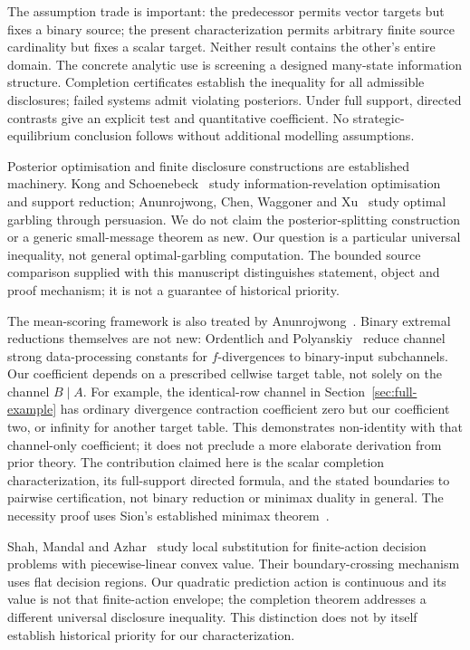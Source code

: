 \documentclass[11pt,a4paper]{article}
\begin{document}
The assumption trade is important: the predecessor permits vector targets but fixes a binary source; the present characterization permits arbitrary finite source cardinality but fixes a scalar target. Neither result contains the other's entire domain. The concrete analytic use is screening a designed many-state information structure. Completion certificates establish the inequality for all admissible disclosures; failed systems admit violating posteriors. Under full support, directed contrasts give an explicit test and quantitative coefficient. No strategic-equilibrium conclusion follows without additional modelling assumptions.

Posterior optimisation and finite disclosure constructions are established machinery. Kong and Schoenebeck~\cite{KS} study information-revelation optimisation and support reduction; Anunrojwong, Chen, Waggoner and Xu~\cite{ACWX} study optimal garbling through persuasion. We do not claim the posterior-splitting construction or a generic small-message theorem as new. Our question is a particular universal inequality, not general optimal-garbling computation. The bounded source comparison supplied with this manuscript distinguishes statement, object and proof mechanism; it is not a guarantee of historical priority.

The mean-scoring framework is also treated by Anunrojwong~\cite[Section 2.4]{Thesis}. Binary extremal reductions themselves are not new: Ordentlich and Polyanskiy~\cite[Theorems 1--2]{OP} reduce channel strong data-processing constants for $f$-divergences to binary-input subchannels. Our coefficient depends on a prescribed cellwise target table, not solely on the channel $B\mid A$. For example, the identical-row channel in Section~\ref{sec:full-example} has ordinary divergence contraction coefficient zero but our coefficient two, or infinity for another target table. This demonstrates non-identity with that channel-only coefficient; it does not preclude a more elaborate derivation from prior theory. The contribution claimed here is the scalar completion characterization, its full-support directed formula, and the stated boundaries to pairwise certification, not binary reduction or minimax duality in general. The necessity proof uses Sion's established minimax theorem~\cite{Sion1958}.

Shah, Mandal and Azhar~\cite[Section 2 and Remark 7]{SMA} study local substitution for finite-action decision problems with piecewise-linear convex value. Their boundary-crossing mechanism uses flat decision regions. Our quadratic prediction action is continuous and its value is not that finite-action envelope; the completion theorem addresses a different universal disclosure inequality. This distinction does not by itself establish historical priority for our characterization.
\end{document}
